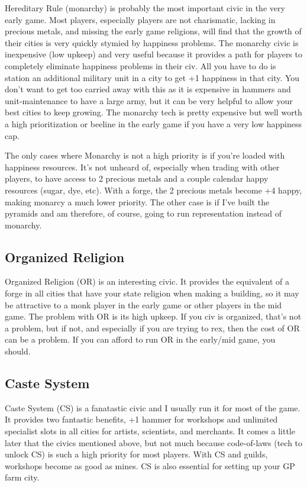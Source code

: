 \documentclass[10pt]{article}
\begin{document}
Hereditary Rule (monarchy) is probably the most important civic in the very early game. Most players,
especially players are not charismatic, lacking in precious metals, and missing the early game religions,
will find that the growth of their cities is very quickly stymied by happiness problems. The monarchy civic
is inexpensive (low upkeep) and very useful because it provides a path for players to completely
eliminate happiness problems in their civ. All you have to do is station an additional military unit in a city
to get +1 happiness in that city. You don't want to get too carried away with this as it is expensive in
hammers and unit-maintenance to have a large army, but it can be very helpful to allow your best cities
to keep growing. The monarchy tech is pretty expensive but well worth a high prioritization or beeline
in the early game if you have a very low happiness cap.

The only cases where Monarchy is not a high priority is if you're loaded with happiness resources. It's not
unheard of, especially when trading with other players, to have access to 2 precious metals and a couple
calendar happy resources (sugar, dye, etc). With a forge, the 2 precious metals become +4 happy, making
monarcy a much lower priority. The other case is if I've built the pyramids and am therefore, of course,
going to run representation instead of monarchy.

\subsection*{Organized Religion}

Organized Religion (OR) is an interesting civic. It provides the equivalent of a forge in all cities that
have your state religion when making a building, so it may be attractive to a monk player in the early game or other players
in the mid game. The problem with OR is its high upkeep. If you civ is organized, that's not a problem, but if not, and
especially if you are trying to rex, then the cost of OR can be a problem. If you can afford to run OR in
the early/mid game, you should.

\subsection*{Caste System}

Caste System (CS) is a fanatastic civic and I usually run it for most of the game. It provides two fantastic benefits,
+1 hammer for workshops and unlimited specialist slots in all cities for artists, scientists, and merchants. It comes a
little later that the civics mentioned above, but not much because code-of-laws (tech to unlock CS) is such a high
priority for most players. With CS and guilds, workshops become as good as mines. CS is also essential for setting up
your GP farm city.
\end{document}
